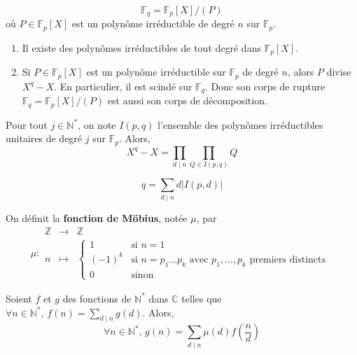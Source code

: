 	
	\begin{theorem}
		\[ \mathbb{F}_q = \mathbb{F}_p[X] / (P) \]
		où $P \in \mathbb{F}_p[X]$ est un polynôme irréductible de degré $n$ sur $\mathbb{F}_p$.
	\end{theorem}
	
	\begin{corollary}
		\begin{enumerate}[label=(\roman*)]
			\item Il existe des polynômes irréductibles de tout degré dans $\mathbb{F}_p[X]$.
			\item Si $P \in \mathbb{F}_p[X]$ est un polynôme irréductible sur $\mathbb{F}_p$ de degré $n$, alors $P$ divise $X^q - X$. En particulier, il est scindé sur $\mathbb{F}_q$. Donc son corps de rupture $\mathbb{F}_q = \mathbb{F}_p[X] / (P)$ est aussi son corps de décomposition.
		\end{enumerate}
	\end{corollary}
	
	\begin{theorem}
		Pour tout $j \in \mathbb{N}^*$, on note $I(p,q)$ l'ensemble des polynômes irréductibles unitaires de degré $j$ sur $\mathbb{F}_p$. Alors,
		\[ X^q - X = \prod_{d \mid n} \prod_{Q \in I(p,q)} Q \]
	\end{theorem}
	
	\begin{corollary}
		\[ q = \sum_{d \mid n} d \vert I(p,d) \vert \]
	\end{corollary}
	
	\begin{definition}
		On définit la \textbf{fonction de Möbius}, notée $\mu$, par
		\[
		\mu :
		\begin{array}{ccc}
			\mathbb{Z} &\rightarrow& \mathbb{Z} \\
			n &\mapsto& \begin{cases}
				1 &\text{si } n = 1 \\
				(-1)^k &\text{si } n = p_1 \dots p_k \text{ avec } p_1, \dots, p_k \text{ premiers distincts} \\
				0 &\text{sinon}
			\end{cases}
		\end{array}
		\]
	\end{definition}
	
	\begin{theorem}
		Soient $f$ et $g$ des fonctions de $\mathbb{N}^*$ dans $\mathbb{C}$ telles que $\forall n \in \mathbb{N}^*, \, f(n) = \sum_{d \mid n} g(d)$. Alors,
		\[ \forall n \in \mathbb{N}^*, \, g(n) = \sum_{d \mid n} \mu(d) f \left( \frac{n}{d} \right) \]
	\end{theorem}
	
